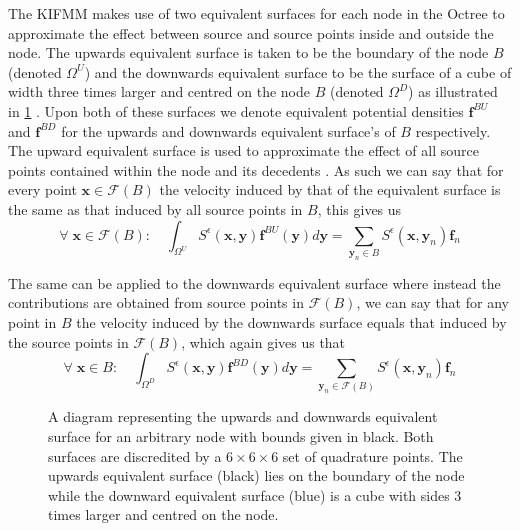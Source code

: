 The KIFMM makes use of two equivalent surfaces for each node in the Octree to approximate the effect between source and source points inside and outside the node. The upwards equivalent surface is taken to be the boundary of the node $B$ (denoted $\Omega^U$) and the downwards equivalent surface to be the surface of a cube of width three times larger and centred on the node $B$ (denoted $\Omega^D$) as illustrated in \cref{fig:UpandDownsurf} \cite{Ying2004}. Upon both of these surfaces we denote equivalent potential densities $\bm{f}^{BU}$ and $\bm{f}^{BD}$ for the upwards and downwards equivalent surface's of $B$ respectively. The upward equivalent surface is used to approximate the effect of all source points contained within the node and its decedents \cite{Rostami2016Kernel-independentStokeslets}. As such we can say that for every point $\bm{x}\in\mathcal{F}(B)$ the velocity induced by that of the equivalent surface is the same as that induced by all source points in $B$, this gives us
\begin{equation}
\label{eq:upsurfint}
    \forall \;\bm{x} \in \mathcal{F}(B): \quad \int_{\Omega^U} S^\epsilon(\bm{x}, \bm{y}) \bm{f}^{BU}(\bm{y}) d \bm{y}=\sum_{{\bm{y}}_n \in B} S^\epsilon\left(\bm{x}, {\bm{y}}_n\right) {\bm{f}}_{n}
\end{equation}

The same can be applied to the downwards equivalent surface where instead the contributions are obtained from source points in $\mathcal{F}(B)$, we can say that for any point in $B$ the velocity induced by the downwards surface equals that induced by the source points in $\mathcal{F}(B)$, which again gives us that
\begin{equation}
\label{eq:downsurfint}
    \forall \;\bm{x} \in B: \quad \int_{\Omega^D} S^\epsilon(\bm{x}, \bm{y}) \bm{f}^{BD}(\bm{y}) d \bm{y}=\sum_{{\bm{y}}_n \in \mathcal{F}(B)} S^\epsilon\left(\bm{x}, {\bm{y}}_n\right) {\bm{f}}_{n}
\end{equation}

\begin{figure}[ht]
    \centering
    \resizebox{.6\linewidth}{!}{}
    \caption{A diagram representing the upwards and downwards equivalent surface for an arbitrary node with bounds given in black. Both surfaces are discredited by a $6 \times 6 \times 6$ set of quadrature points. The upwards equivalent surface (black) lies on the boundary of the node while the downward equivalent surface (blue) is a cube with sides 3 times larger and centred on the node. }
    \label{fig:UpandDownsurf}
\end{figure}

